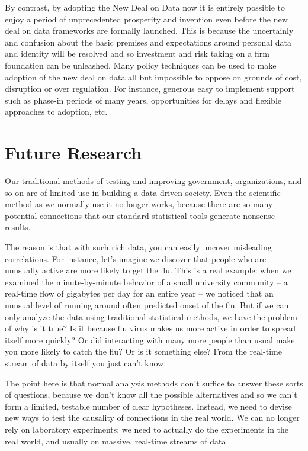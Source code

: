 By contrast, by adopting the New Deal on Data now it is entirely possible to enjoy a period of unprecedented prosperity and invention even before the new deal on data frameworks are formally launched. This is because the uncertainly and confusion about the basic premises and expectations around personal data and identity will be resolved and so investment and risk taking on a firm foundation can be unleashed. Many policy techniques can be used to make adoption of the new deal on data all but impossible to oppose on grounds of cost, disruption or over regulation. For instance, generous easy to implement support such as phase-in periods of many years, opportunities for delays and flexible approaches to adoption, etc.

\section{Future Research}

Our traditional methods of testing and improving government, organizations, and so on are of limited use in building a data driven society. Even the scientific method as we normally use it no longer works, because there are so many potential connections that our standard statistical tools generate nonsense results.

The reason is that with such rich data, you can easily uncover misleading correlations. For instance, let’s imagine we discover that people who are unusually active are more likely to get the flu. This is a real example: when we examined the minute-by-minute behavior of a small university community – a real-time flow of gigabytes per day for an entire year – we noticed that an unusual level of running around often predicted onset of the flu. But if we can only analyze the data using traditional statistical methods, we have the problem of why is it true? Is it because flu virus makes us more active in order to spread itself more quickly? Or did interacting with many more people than usual make you more likely to catch the flu? Or is it something else? From the real-time stream of data by itself you just can’t know.

The point here is that normal analysis methods don't suffice to answer these sorts of questions, because we don’t know all the possible alternatives and so we can’t form a limited, testable number of clear hypotheses. Instead, we need to devise new ways to test the causality of connections in the real world. We can no longer rely on laboratory experiments; we need to actually do the experiments in the real world, and usually on massive, real-time streams of data.

